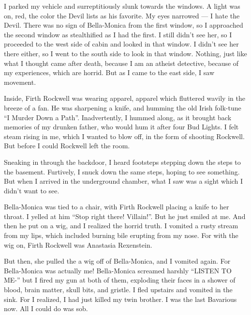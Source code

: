 I parked my vehicle and surreptitiously slunk towards the windows.
A light was on, red, the color the Devil lists as his favorite. My
eyes narrowed --- I hate the Devil. There was no sign of
Bella-Monica from the first window, so I approached the second
window as stealthified as I had the first. I still didn't see her,
so I proceeded to the west side of cabin and looked in that window.
I didn't see her there either, so I went to the south side to look
in that window. Nothing, just like what I thought came after death,
because I am an atheist detective, because of my experiences, which
are horrid. But as I came to the east side, I saw movement.



Inside, Firth Rockwell was wearing apparel, apparel which fluttered
wavily in the breeze of a fan. He was sharpening a knife, and
humming the old Irish folk-tune ``I Murder Down a Path''.
Inadvertently, I hummed along, as it brought back memories of my
drunken father, who would hum it after four Bud Lights. I felt
steam rising in me, which I wanted to blow off, in the form of
shooting Rockwell. But before I could Rockwell left the room.



Sneaking in through the backdoor, I heard footsteps stepping down
the steps to the basement. Furtively, I snuck down the same steps,
hoping to see something. But when I arrived in the underground
chamber, what I saw was a sight which I didn't want to see.



Bella-Monica was tied to a chair, with Firth Rockwell placing a
knife to her throat. I yelled at him ``Stop right there!
Villain!''. But he just smiled at me. And then he put on a
wig, and I realized the horrid truth. I vomited a rusty stream from
my lips, which included burning bile erupting from my nose. For
with the wig on, Firth Rockwell was Anastasia Rexenstein.



But then, she pulled the a wig off of Bella-Monica, and I vomited
again. For Bella-Monica was actually me! Bella-Monica screamed
harshly ``LISTEN TO ME-'' but I fired my gun at both of them,
exploding their faces in a shower of blood, brain matter, skull
bits, and gristle. I fled upstairs and vomited in the sink. For I
realized, I had just killed my twin brother. I was the last
Bavarious now. All I could do was sob. 

 





